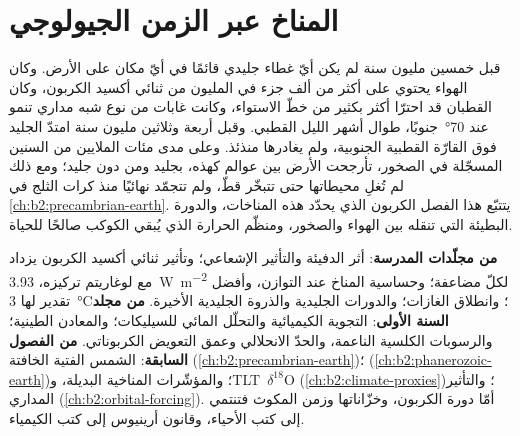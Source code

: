 \chapter{المناخ عبر الزمن الجيولوجي}\label{ch:b2:deep-time-climate}

قبل خمسين مليون سنة لم يكن أيّ غطاء جليدي قائمًا في أيّ مكان على الأرض. وكان الهواء يحتوي على أكثر من
ألف جزء في المليون من ثنائي أكسيد الكربون، وكان القطبان قد احترّا أكثر بكثير من خطّ الاستواء،
وكانت غابات من نوع شبه مداري تنمو عند \ang{70}~جنوبًا، طوال أشهر الليل القطبي. وقبل أربعة وثلاثين
مليون سنة امتدّ الجليد فوق القارّة القطبية الجنوبية، ولم يغادرها منذئذ. وعلى مدى مئات الملايين
من السنين المسجّلة في الصخور، تأرجحت الأرض بين عوالم كهذه، بجليد ومن دون جليد؛ ومع ذلك
لم تُغلِ محيطاتها حتى تتبخّر قطّ، ولم تتجمّد نهائيًا منذ كرات الثلج في
\cref{ch:b2:precambrian-earth}. يتتبّع هذا الفصل الكربون الذي يحدّد هذه المناخات، والدورة البطيئة
التي تنقله بين الهواء والصخور، ومنظّم الحرارة الذي يُبقي الكوكب
صالحًا للحياة.

\begin{recall}
\textbf{من مجلّدات المدرسة}: أثر الدفيئة والتأثير الإشعاعي؛ وتأثير
ثنائي أكسيد الكربون يزداد مع لوغاريتم تركيزه، \qty{3.93}{W.m^{-2}} لكلّ مضاعفة؛
وحساسية المناخ عند التوازن، وأفضل تقدير لها \qty{3}{\celsius}؛ وانطلاق الغازات؛ والدورات الجليدية
والذروة الجليدية الأخيرة. \textbf{من مجلد السنة الأولى}: التجوية الكيميائية
والتحلّل المائي للسيليكات؛ والمعادن الطينية؛ والرسوبات الكلسية الناعمة، والحدّ الانحلالي وعمق
التعويض الكربوناتي. \textbf{من الفصول السابقة}: الشمس الفتية الخافتة 
(\cref{ch:b2:precambrian-earth})؛  
(\cref{ch:b2:phanerozoic-earth})؛ والمؤشّرات المناخية البديلة، و\mbox{\textdir TLT $\delta^{18}$O} 
(\cref{ch:b2:climate-proxies})؛ والتأثير المداري (\cref{ch:b2:orbital-forcing}). أمّا دورة الكربون،
وخزّاناتها وزمن المكوث فتنتمي إلى كتب الأحياء، وقانون أرينيوس إلى
كتب الكيمياء.
\end{recall}

